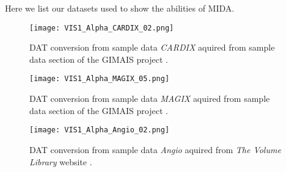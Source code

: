 Here we list our datasets used to show the abilities of MIDA.


\begin{figure}[h]
	\centering
	\texttt{[image: VIS1\_Alpha\_CARDIX\_02.png]} \\
	\caption{DAT conversion from sample data \emph{CARDIX} \cite{gimias_sampledata_2018} aquired from sample data section of the GIMAIS project \cite{gimias_2018}.}
	\label{fig:Vis1_Alpha_CARDIX_02}
\end{figure}

\begin{figure}[h]
	\centering
	\texttt{[image: VIS1\_Alpha\_MAGIX\_05.png]} \\
	\caption{DAT conversion from sample data \emph{MAGIX} \cite{gimias_sampledata_2018} aquired from sample data section of the GIMAIS project \cite{gimias_2018}.}
	\label{fig:Vis1_Alpha_MAGIX_05}
\end{figure}


\begin{figure}[h]
	\centering
	\texttt{[image: VIS1\_Alpha\_Angio\_02.png]} \\
	\caption{DAT conversion from sample data \emph{Angio} \cite{roettger_VOL_2018} aquired from \emph{The Volume Library} website \cite{roettger_VOL_2018}.}
	\label{fig:Vis1_Alpha_Angio_02}
\end{figure}
